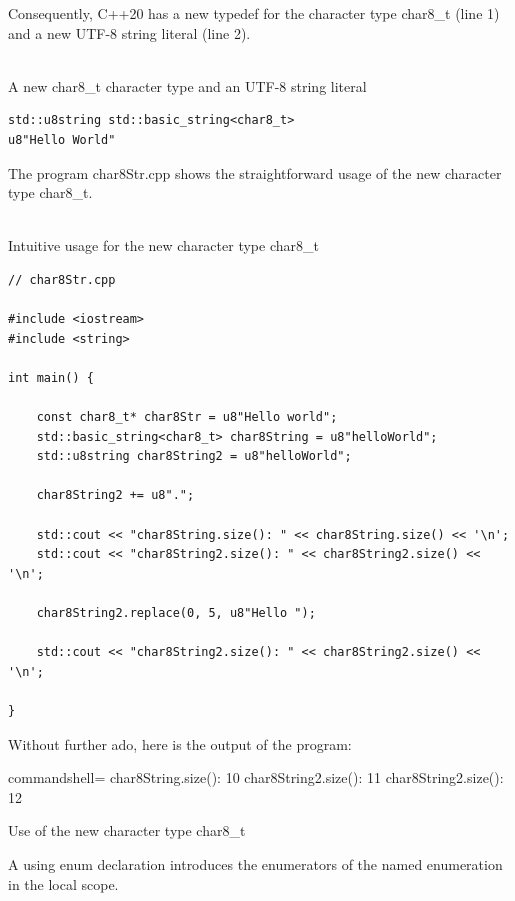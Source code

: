 Consequently, C++20 has a new typedef for the character type char8\_t (line 1) and a new UTF-8 string literal (line 2).

\hspace*{\fill} \\ %
\noindent
A new char8\_t character type and an UTF-8 string literal
\begin{lstlisting}[style=styleCXX]
std::u8string std::basic_string<char8_t>
u8"Hello World"
\end{lstlisting}

The program char8Str.cpp shows the straightforward usage of the new character type char8\_t.

\hspace*{\fill} \\ %
\noindent
Intuitive usage for the new character type char8\_t
\begin{lstlisting}[style=styleCXX]
// char8Str.cpp

#include <iostream>
#include <string>

int main() {
	
	const char8_t* char8Str = u8"Hello world";
	std::basic_string<char8_t> char8String = u8"helloWorld";
	std::u8string char8String2 = u8"helloWorld";
	
	char8String2 += u8".";
	
	std::cout << "char8String.size(): " << char8String.size() << '\n';
	std::cout << "char8String2.size(): " << char8String2.size() << '\n';
	
	char8String2.replace(0, 5, u8"Hello ");
	
	std::cout << "char8String2.size(): " << char8String2.size() << '\n';

}
\end{lstlisting}

Without further ado, here is the output of the program:

\begin{tcblisting}{commandshell={}}
char8String.size(): 10
char8String2.size(): 11
char8String2.size(): 12
\end{tcblisting}

\begin{center}
Use of the new character type char8\_t
\end{center}


A using enum declaration introduces the enumerators of the named enumeration in the local scope.

